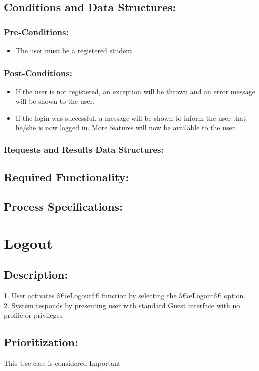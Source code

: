 \documentclass[a4paper,11pt]{article}
\begin{document}
\subsection{Conditions and Data Structures:}
\subsubsection*{Pre-Conditions:}
\begin{itemize}
	\item The user must be a registered student.
\end{itemize}
\subsubsection*{Post-Conditions:}
\begin{itemize}
	\item If the user is not registered, an exception will be thrown and an error message will be shown to the user.
	\item If the login was successful, a message will be shown to inform the user that he/she is now logged in. More features will now be available to the user.
\end{itemize}
\subsubsection*{Requests and Results Data Structures:}
\subsection{Required Functionality:} 
\subsection{Process Specifications:} 

\section{Logout}
\subsection*{Description:}
1.	User activates â€œLogoutâ€ function by selecting the â€œLogoutâ€ option.\\
2.	System responds by presenting user with standard Guest interface with no profile or privileges\\
\subsection{Prioritization:}
This Use case is considered Important\\ 
\end{document}
